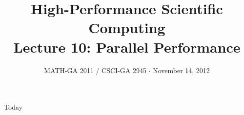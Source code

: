 \documentclass[english,compress]{beamer}
\begin{document}

\title{High-Performance Scientific Computing\\Lecture 10: Parallel Performance}

\date{MATH-GA 2011 / CSCI-GA 2945 $\cdot$ November 14, 2012}

\frame{\titlepage}

\begin{frame}{Today}
  \tableofcontents[hideallsubsections]
\end{frame}
\begin{comment}
\begin{frame}{Bits and pieces}
  \begin{itemize}
    \item Don't have a project? Let's fix that \emph{very soon}
    \item HW5: soon
    \item HW6: due today
    \item Dec 5: Last day of regular class
    \item Dec 12: Legislative Day
    \item Dec 17/18/\textbf{19}: Project presentations
    \item Don't have grade reports for HW1\dots4? Talk to me
  \end{itemize}
\end{frame}
\end{comment}
\end{document}
